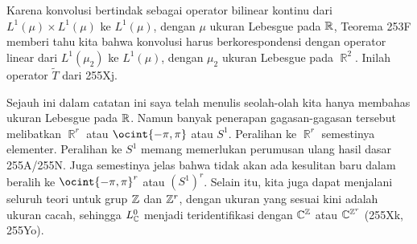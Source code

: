 {Karena konvolusi bertindak sebagai operator bilinear kontinu dari
$L^1(\mu)\times L^1(\mu)$ ke $L^1(\mu)$, dengan $\mu$ ukuran Lebesgue
pada $\Bbb R$, Teorema 253F memberi tahu kita bahwa konvolusi harus berkorespondensi dengan operator linear
dari $L^1(\mu_2)$ ke $L^1(\mu)$, dengan $\mu_2$ ukuran Lebesgue
pada $\BbbR^2$.  Inilah operator $\tilde T$ dari 255Xj.

Sejauh ini dalam catatan ini saya telah menulis seolah-olah kita hanya membahas
ukuran Lebesgue pada $\Bbb R$.   Namun banyak penerapan gagasan-gagasan tersebut
melibatkan $\BbbR^r$ atau $\ocint{-\pi,\pi}$ atau $S^1$.   Peralihan ke
$\BbbR^r$ semestinya elementer.   Peralihan ke $S^1$ memang memerlukan
perumusan ulang hasil dasar 255A/255N.   Juga semestinya jelas
bahwa tidak akan ada kesulitan baru dalam beralih ke $\ocint{-\pi,\pi}^r$
atau $(S^1)^r$.   Selain itu, kita juga dapat menjalani seluruh teori untuk
grup $\Bbb Z$ dan $\Bbb Z^r$, dengan ukuran yang sesuai kini adalah
ukuran cacah, sehingga $L^0_{\Bbb C}$ menjadi teridentifikasi dengan
$\Bbb C^{\Bbb Z}$ atau $\Bbb C^{\Bbb Z^r}$ (255Xk, 255Yo).


}%

\discrpage
